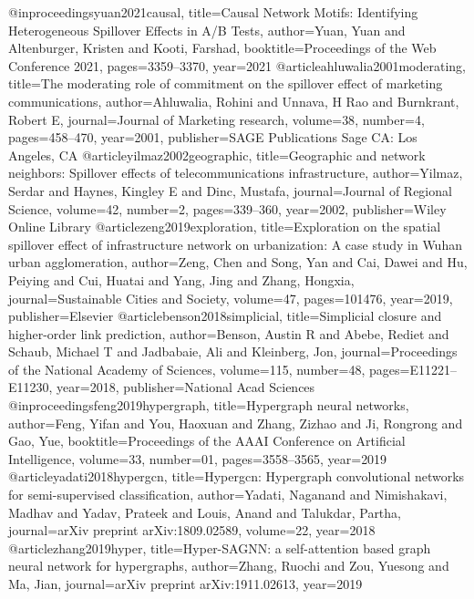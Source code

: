 @inproceedings{yuan2021causal,
  title={Causal Network Motifs: Identifying Heterogeneous Spillover Effects in A/B Tests},
  author={Yuan, Yuan and Altenburger, Kristen and Kooti, Farshad},
  booktitle={Proceedings of the Web Conference 2021},
  pages={3359--3370},
  year={2021}
}
@article{ahluwalia2001moderating,
  title={The moderating role of commitment on the spillover effect of marketing communications},
  author={Ahluwalia, Rohini and Unnava, H Rao and Burnkrant, Robert E},
  journal={Journal of Marketing research},
  volume={38},
  number={4},
  pages={458--470},
  year={2001},
  publisher={SAGE Publications Sage CA: Los Angeles, CA}
}
@article{yilmaz2002geographic,
  title={Geographic and network neighbors: Spillover effects of telecommunications infrastructure},
  author={Yilmaz, Serdar and Haynes, Kingley E and Dinc, Mustafa},
  journal={Journal of Regional Science},
  volume={42},
  number={2},
  pages={339--360},
  year={2002},
  publisher={Wiley Online Library}
}
@article{zeng2019exploration,
  title={Exploration on the spatial spillover effect of infrastructure network on urbanization: A case study in Wuhan urban agglomeration},
  author={Zeng, Chen and Song, Yan and Cai, Dawei and Hu, Peiying and Cui, Huatai and Yang, Jing and Zhang, Hongxia},
  journal={Sustainable Cities and Society},
  volume={47},
  pages={101476},
  year={2019},
  publisher={Elsevier}
}
@article{benson2018simplicial,
  title={Simplicial closure and higher-order link prediction},
  author={Benson, Austin R and Abebe, Rediet and Schaub, Michael T and Jadbabaie, Ali and Kleinberg, Jon},
  journal={Proceedings of the National Academy of Sciences},
  volume={115},
  number={48},
  pages={E11221--E11230},
  year={2018},
  publisher={National Acad Sciences}
}
@inproceedings{feng2019hypergraph,
  title={Hypergraph neural networks},
  author={Feng, Yifan and You, Haoxuan and Zhang, Zizhao and Ji, Rongrong and Gao, Yue},
  booktitle={Proceedings of the AAAI Conference on Artificial Intelligence},
  volume={33},
  number={01},
  pages={3558--3565},
  year={2019}
}
@article{yadati2018hypergcn,
  title={Hypergcn: Hypergraph convolutional networks for semi-supervised classification},
  author={Yadati, Naganand and Nimishakavi, Madhav and Yadav, Prateek and Louis, Anand and Talukdar, Partha},
  journal={arXiv preprint arXiv:1809.02589},
  volume={22},
  year={2018}
}
@article{zhang2019hyper,
  title={Hyper-SAGNN: a self-attention based graph neural network for hypergraphs},
  author={Zhang, Ruochi and Zou, Yuesong and Ma, Jian},
  journal={arXiv preprint arXiv:1911.02613},
  year={2019}
}
